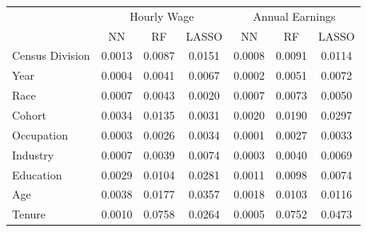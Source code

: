 \begin{tabular}{lccc|ccc}
\hline\hline
 & \multicolumn{3}{c|}{Hourly Wage} & \multicolumn{3}{c}{Annual Earnings} \\
 & NN & RF & LASSO & NN & RF & LASSO \\
\hline
Census Division&0.0013&0.0087&0.0151&0.0008&0.0091&0.0114\\
Year&0.0004&0.0041&0.0067&0.0002&0.0051&0.0072\\
Race&0.0007&0.0043&0.0020&0.0007&0.0073&0.0050\\
Cohort&0.0034&0.0135&0.0031&0.0020&0.0190&0.0297\\
Occupation&0.0003&0.0026&0.0034&0.0001&0.0027&0.0033\\
Industry&0.0007&0.0039&0.0074&0.0003&0.0040&0.0069\\
Education&0.0029&0.0104&0.0281&0.0011&0.0098&0.0074\\
Age&0.0038&0.0177&0.0357&0.0018&0.0103&0.0116\\
Tenure&0.0010&0.0758&0.0264&0.0005&0.0752&0.0473\\
\hline\hline
\end{tabular}
